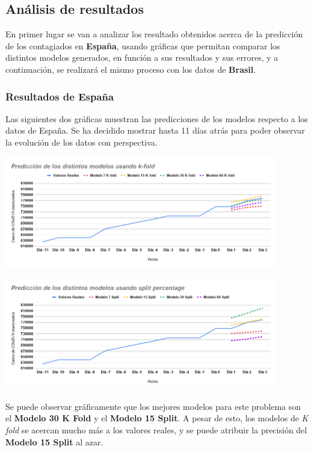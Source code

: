 \documentclass[12pt,a4paper, xcolor=table]{article}
\begin{document}
    \subsection{Análisis de resultados}

    En primer lugar se van a analizar los resultado obtenidos acerca de la predicción de los contagiados en \textbf{España}, usando gráficas que permitan comparar los distintos modelos generados, en función a sus resultados y sus errores, y a continuación, se realizará el mismo proceso con los datos de \textbf{Brasil}.

    \subsubsection{Resultados de España}

    Las siguientes dos gráficas muestran las predicciones de los modelos respecto a los datos de España. Se ha decidido mostrar hasta 11 días atrás para poder observar la evolución de los datos con perspectiva.

    \begin{center}
        \includegraphics[width=450px]{img/pred_modelos_kFold_ES.png}
    \end{center}

    \begin{center}
        \centering
        \includegraphics[width=450px]{img/pred_modelos_split_ES.png}
    \end{center}

    Se puede observar gráficamente que los mejores modelos para este problema son el \textbf{Modelo 30 K Fold} y el \textbf{Modelo 15 Split}. A pesar de esto, los modelos de \textit{K fold} se acercan mucho más a los valores reales, y se puede atribuir la precisión del \textbf{Modelo 15 Split} al azar.
\end{document}
